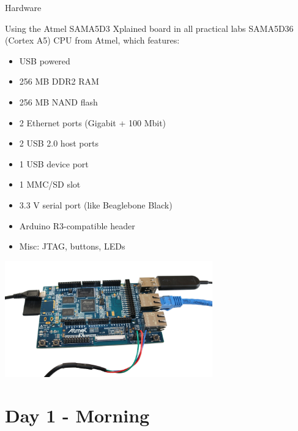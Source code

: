 \documentclass[a4paper,12pt,obeyspaces,spaces,hyphens]{article}
\begin{document}
\feagendatwocolumn
{Hardware}
{
	Using the Atmel SAMA5D3 Xplained board in all practical labs
	SAMA5D36 (Cortex A5) CPU from Atmel, which features:

  \begin{itemize}
  \item USB powered
  \item 256 MB DDR2 RAM
  \item 256 MB NAND flash
  \item 2 Ethernet ports (Gigabit + 100 Mbit)
  \item 2 USB 2.0 host ports
  \item 1 USB device port
  \item 1 MMC/SD slot
  \item 3.3 V serial port (like Beaglebone Black)
  \item Arduino R3-compatible header
  \item Misc: JTAG, buttons, LEDs
  \end{itemize}
}
{}
{
  \begin{center}
    \includegraphics[height=5cm]{../slides/xplained-board/xplained-board.png}
  \end{center}
}

\section{Day 1 - Morning}
\end{document}
